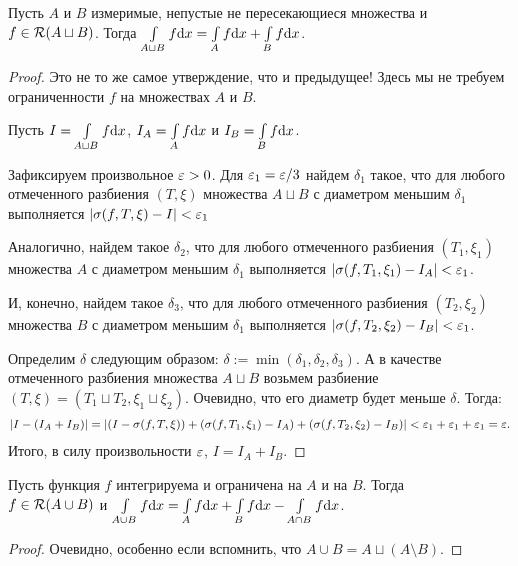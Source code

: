 \begin{Statement}
Пусть $A$ и $B$ измеримые, непустые не пересекающиеся множества и \\$f \in \mathcal{R}(A \sqcup B)$. Тогда $\int\limits_{A \sqcup B}f \mathrm{d} x = \int\limits_A f \mathrm{d} x + \int\limits_B f \mathrm{d} x$.
\end{Statement}
\begin{proof}
Это не то же самое утверждение, что и предыдущее! Здесь мы не требуем ограниченности $f$ на множествах $A$ и $B$.

Пусть $I = \int\limits_{A \sqcup B}f \mathrm{d} x$, $I_A = \int\limits_A f \mathrm{d} x$ и $I_B =\int\limits_B f \mathrm{d} x$.

Зафиксируем произвольное $\varepsilon > 0$. Для $\varepsilon_1 = \varepsilon / 3$ найдем $\delta_1$ такое, что для любого отмеченного разбиения $(T, \xi)$ множества $A \sqcup B$ с диаметром меньшим $\delta_1$ выполняется $|\sigma(f, T, \xi) - I| < \varepsilon_1$

Аналогично, найдем такое $\delta_2$, что для любого отмеченного разбиения $(T_1, \xi_1)$ множества $A$ с диаметром меньшим $\delta_1$ выполняется $|\sigma(f, T_1, \xi_1) - I_A| < \varepsilon_1$.

И, конечно, найдем такое $\delta_3$, что для любого отмеченного разбиения $(T_2, \xi_2)$ множества $B$ с диаметром меньшим $\delta_1$ выполняется $|\sigma(f, T_2, \xi_2) - I_B| < \varepsilon_1$.

Определим $\delta$ следующим образом: $\delta := \min(\delta_1, \delta_2, \delta_3)$. А в качестве отмеченного разбиения множества $A \sqcup B$ возьмем разбиение $(T, \xi) = (T_1 \sqcup T_2, \xi_1 \sqcup \xi_2)$. Очевидно, что его диаметр будет меньше $\delta$. Тогда:
\begin{gather}
|I - (I_A + I_B)| = \left| (I - \sigma(f, T, \xi)) + (\sigma(f, T_1, \xi_1) - I_A) + (\sigma(f, T_2, \xi_2) - I_B) \right| < \varepsilon_1 + \varepsilon_1 + \varepsilon_1 = \varepsilon.
\end{gather}
Итого, в силу произвольности $\varepsilon$, $I = I_A + I_B$.
\end{proof}

\begin{Statement}
Пусть функция $f$ интегрируема и ограничена на $A$ и на $B$. Тогда \\$f \in \mathcal{R}(A \cup B)$ и $\int\limits_{A \cup B} f\mathrm{d}x = \int\limits_A f \mathrm{d}x + \int\limits_B f \mathrm{d}x - \int\limits_{A \cap B} f\mathrm{d}x$.
\end{Statement}
\begin{proof}
Очевидно, особенно если вспомнить, что $A \cup B = A \sqcup (A \setminus B)$.
\end{proof}

